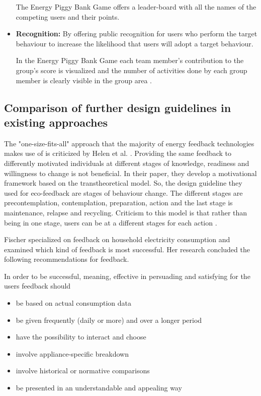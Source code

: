 \begin{itemize}
	The Energy Piggy Bank Game \cite{Bjorn1165339} offers a leader-board with all the names of the competing users and their points.
	
	\item \textbf{Recognition:}
	By offering public recognition for users who perform the target behaviour to increase the likelihood that users will adopt a target behaviour.
	
	In the Energy Piggy Bank Game each team member’s contribution to the group’s score is visualized and the number of activities done by each group member is clearly visible in the group area \cite{Bjorn1165339}.
	
\end{itemize}

\subsection{Comparison of further design guidelines in existing approaches}

The "one-size-fits-all" approach that the majority of energy feedback technologies makes use of is criticized by Helen et al. \cite{he2010one}. Providing the same feedback to differently motivated individuals at different stages of knowledge, readiness and willingness to change is not beneficial. In their paper, they develop a motivational framework based on the transtheoretical model. So, the design guideline they used for eco-feedback are stages of behaviour change. The different stages are precontemplation, contemplation, preparation, action and the last stage is maintenance, relapse and recycling. Criticism to this model is that rather than being in one stage, users can be at a different stages for each action \cite{mcconnaughy1983stages}.

Fischer \cite{fischer2008feedback} specialized on feedback on household electricity consumption and examined which kind of feedback is most successful. Her research concluded the following recommendations for feedback.

In order to be successful, meaning, effective in persuading and satisfying for the users feedback should
\begin{itemize}
	\item be based on actual consumption data
	\item be given frequently (daily or more) and over a longer period
	\item have the possibility to interact and choose
	\item involve appliance-specific breakdown
	\item involve historical or normative comparisons
	\item be presented in an understandable and appealing way
\end{itemize}

